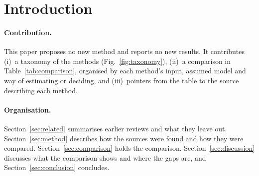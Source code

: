 \section{Introduction}
\label{sec:intro}





\paragraph{Contribution.}
This paper proposes no new method and reports no new results. It contributes
(i)~a taxonomy of the methods (Fig.~\ref{fig:taxonomy}),
(ii)~a comparison in Table~\ref{tab:comparison}, organised by each method's input, assumed
model and way of estimating or deciding, and
(iii)~pointers from the table to the source describing each method.

\paragraph{Organisation.}
Section~\ref{sec:related} summarises earlier reviews and what they leave out.
Section~\ref{sec:method} describes how the sources were found and how they were compared.
Section~\ref{sec:comparison} holds the comparison. Section~\ref{sec:discussion} discusses what
the comparison shows and where the gaps are, and Section~\ref{sec:conclusion} concludes.
